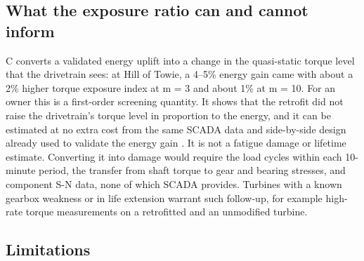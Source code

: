\documentclass[preprint,12pt]{elsarticle}
\begin{document}
\subsection{What the exposure ratio can and cannot inform}

C converts a validated energy uplift into a change in the quasi-static torque level that the drivetrain sees: at Hill of Towie, a 4--5\% energy gain came with about a 2\% higher torque exposure index at m = 3 and about 1\% at m = 10. For an owner this is a first-order screening quantity. It shows that the retrofit did not raise the drivetrain's torque level in proportion to the energy, and it can be estimated at no extra cost from the same SCADA data and side-by-side design already used to validate the energy gain \cite{astolfi18,clerc}. It is not a fatigue damage or lifetime estimate. Converting it into damage would require the load cycles within each 10-minute period, the transfer from shaft torque to gear and bearing stresses, and component S-N data, none of which SCADA provides. Turbines with a known gearbox weakness or in life extension warrant such follow-up, for example high-rate torque measurements on a retrofitted and an unmodified turbine.

\subsection{Limitations}
\end{document}
